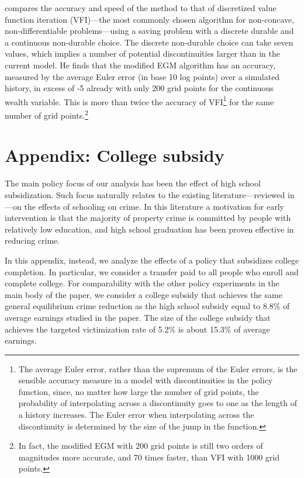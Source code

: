 \documentclass[a4paper,dvips,12pt]{article}
\begin{document}
   compares the accuracy and speed of the method to that of discretized value function iteration (VFI)---the most
  commonly chosen algorithm for non-concave, non-differentiable problems---using a saving problem with a discrete durable and a continuous
  non-durable choice. The discrete non-durable choice can take seven values, which implies a number of potential discontinuities larger
  than in the current model. He finds that the modified EGM algorithm has an accuracy, measured by the average Euler error (in base 10 log
  points) over a simulated history, in excess of -5 already with only 200 grid points for the continuous wealth variable. This is more than
  twice the accuracy of VFI\footnote{The average Euler error, rather than the supremum of the Euler errors, is the sensible accuracy
    measure in a model with discontinuities in the policy function, since, no matter how large the number of grid points, the
    probability of interpolating across a discontinuity goes to one as the length of a history increases. The Euler error when
    interpolating across the discontinuity is determined by the size of the jump in the function. } for the same number of grid
  points.\footnote{In fact, the modified EGM with 200 grid points is still two orders of magnitudes more accurate, and 70 times faster,
    than VFI with 1000 grid points.}

\section{Appendix: College subsidy}
\label{sec:college-subsidy}
The main policy focus of our analysis has been the effect of high school subsidization. Such focus naturally relates to the existing literature---reviewed in ---on the effects of schooling on crime. In this literature a motivation for early intervention is that the majority of property crime is committed by people with relatively low education, and high school graduation has been proven effective in reducing crime.

In this appendix, instead, we analyze the effects of a policy that subsidizes college completion. In particular, we consider a transfer paid to all people who enroll and complete college.
For comparability with the other policy experiments in the main body of the paper, we consider a college subsidy that achieves the same general equilibrium crime reduction as the high school subsidy equal to 8.8\% of average earnings studied in the paper. The size of the college subsidy that achieves the targeted victimization rate of 5.2\% is about 15.3\% of average earnings.
\end{document}

